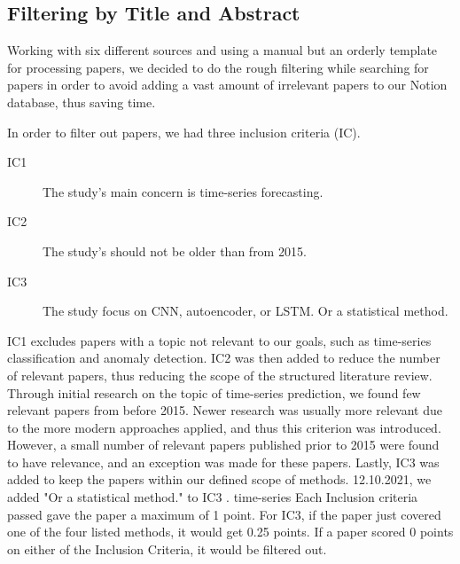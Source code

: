 \subsection{Filtering by Title and Abstract}
Working with six different sources and using a manual but an orderly template for processing papers,
we decided to do the rough filtering while searching for papers in order to avoid adding a vast amount of irrelevant
papers to our Notion database, thus saving time.

In order to filter out papers, we had three inclusion criteria (IC).
\begin{description}
    \item[IC1] The study's main concern is time-series forecasting.
    \item[IC2] The study's should not be older than from 2015.
    \item[IC3] The study focus on CNN, autoencoder, or LSTM. Or a statistical method.
\end{description}
IC1 excludes papers with a topic not relevant to our goals, such as time-series classification and anomaly detection.
IC2 was then added to reduce the number of relevant papers, thus reducing the scope of the structured literature review.
Through initial research on the topic of time-series prediction, we found few relevant papers from before 2015.
Newer research was usually more relevant due to the more modern approaches applied, and thus this criterion was introduced.
However, a small number of relevant papers published prior to 2015 were found to have relevance, and an exception was made for these papers.
Lastly, IC3 was added to keep the papers within our defined scope of methods. 12.10.2021, we added "Or a statistical method."
to IC3 \citep{decisionmatrix}.
time-series
Each Inclusion criteria passed gave the paper a maximum of 1 point. For IC3, if the paper just covered one of the
four listed methods, it would get 0.25 points. If a paper scored 0 points on either of the Inclusion Criteria, it would be filtered out.

